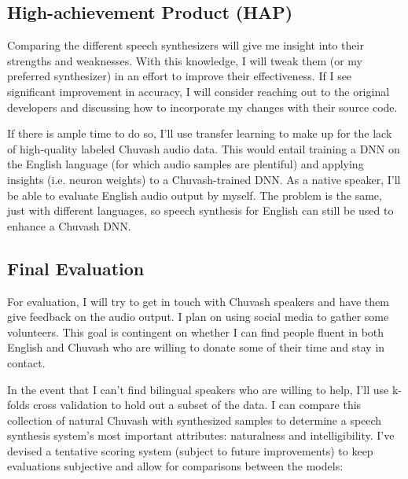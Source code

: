 \documentclass[fleqn,10pt]{SelfArx} %
\begin{document}
\subsection{High-achievement Product (HAP)}
Comparing the different speech synthesizers will give me insight into their strengths and weaknesses. With this knowledge, I will tweak them (or my preferred synthesizer) in an effort to improve their effectiveness. If I see significant improvement in accuracy, I will consider reaching out to the original developers and discussing how to incorporate my changes with their source code.

If there is ample time to do so, I'll use transfer learning to make up for the lack of high-quality labeled Chuvash audio data. This would entail training a DNN on the English language (for which audio samples are plentiful) and applying insights (i.e. neuron weights) to a Chuvash-trained DNN\cite{tdsTransferLearning}. As a native speaker, I'll be able to evaluate English audio output by myself. The problem is the same, just with different languages, so speech synthesis for English can still be used to enhance a Chuvash DNN.

\subsection{Final Evaluation}
For evaluation, I will try to get in touch with Chuvash speakers and have them give feedback on the audio output. I plan on using social media to gather some volunteers. This goal is contingent on whether I can find people fluent in both English and Chuvash who are willing to donate some of their time and stay in contact.

In the event that I can't find bilingual speakers who are willing to help, I'll use k-folds cross validation to hold out a subset of the data. I can compare this collection of natural Chuvash with synthesized samples to determine a speech synthesis system's most important attributes: naturalness and intelligibility\cite{taylorTTS}. I've devised a tentative scoring system (subject to future improvements) to keep evaluations subjective and allow for comparisons between the models:
\end{document}
